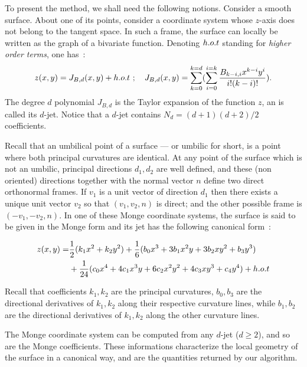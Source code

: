 To present the method, we shall need the following notions. Consider a
smooth surface.  About one of its points, consider a coordinate system
whose $z$-axis does not belong to the tangent space. In such a frame,
the surface can locally be written as the graph of a bivariate
function. Denoting $h.o.t$ standing for {\em higher order terms}, one
has~:
%
\begin{equation}
z(x,y)=J_{B,d}(x,y) + h.o.t \ ; \quad 
J_{B,d}(x,y)=\sum_{k=0}^{k=d}(\sum_{i=0}^{i=k}
\frac{B_{k-i,i}x^{k-i}y^{i}}{i!(k-i)!}).
\end{equation}
The degree $d$ polynomial $J_{B,d}$ is the Taylor expansion of the
function $z$, an is called its $d$-jet. Notice that a $d$-jet contains
$N_d=(d+1)(d+2)/2$ coefficients.

Recall that an umbilical point of a surface --- or umbilic for short,
is a point where both principal curvatures are identical.  At any
point of the surface which is not an umbilic, principal directions
$d_1, d_2$ are well defined, and these (non oriented) directions
together with the normal vector $n$ define two direct orthonormal
frames. If $v_1$ is a unit vector of direction $d_1$ then there exists
a unique unit vector $v_2$ so that $(v_1,v_2,n)$ is direct; and the
other possible frame is $(-v_1,-v_2,n)$. In one of these Monge
coordinate systems, the surface is said to be given in the Monge form
and its jet has the following canonical form~:

\begin{eqnarray}
\label{eq:monge}
z(x,y) =  & \frac{1}{2}(k_1x^2 + k_2y^2)+
	\frac{1}{6}(b_0x^3+3b_1x^2y+3b_2xy^2+b_3y^3) \\
  &  +\frac{1}{24}(c_0x^4+4c_1x^3y+6c_2x^2y^2+4c_3xy^3+c_4y^4) + h.o.t
\end{eqnarray}

Recall that coefficients $k_1, k_2$ are the principal curvatures,
$b_0,b_3$ are the directional derivatives of $k_1,k_2$ along their
respective curvature lines, while $b_1,b_2$ are the directional
derivatives of $k_1,k_2$ along the other curvature lines.

The Monge coordinate system can be computed from any $d$-jet ($d\geq
2$), and so are the Monge coefficients. These informations
characterize the local geometry of the surface in a canonical way, and
are the quantities returned by our algorithm.


